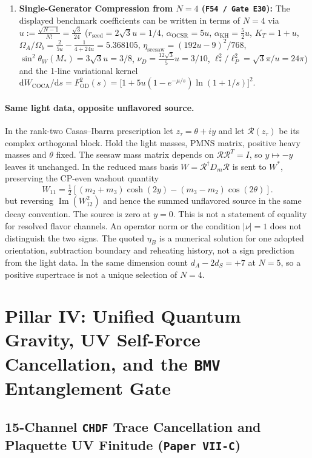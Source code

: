 \documentclass[11pt,a4paper]{article}
\begin{document}
\begin{enumerate}[label=(\arabic*),leftmargin=1.8em,itemsep=2pt]
\item \textbf{Single-Generator Compression from $N = 4$ (\texttt{F54 / Gate E30}):} The displayed benchmark coefficients can be written in terms of $N = 4$ via $u := \frac{\sqrt{N-1}}{N!} = \frac{\sqrt{3}}{24}$ ($r_{\mathrm{seed}} = 2\sqrt{3}u = 1/4$, $\alpha_{\mathrm{OCSR}} = 5u$, $\alpha_{\mathrm{KH}} = \frac{5}{2}u$, $K_T = 1+u$, $\Omega_A/\Omega_b = \frac{2}{5u} - \frac{1}{4+24u} = 5.368105$, $\eta_{\mathrm{seesaw}} = (192u-9)^2/768$, $\sin^2\theta_W(M_*) = 3\sqrt{3}u = 3/8$, $\nu_D = \frac{12\sqrt{3}}{5}u = 3/10$, $\ell_*^2/\ell_P^2 = \sqrt{3}\pi/u = 24\pi$) and the 1-line variational kernel $\mathrm{d}W_{\mathrm{COCA}}/\mathrm{d}s = F_{\mathrm{OD}}^2(s) = \bigl[1 + 5u(1 - e^{-\mu/s})\ln(1 + 1/s)\bigr]^2$.
\end{enumerate}

\paragraph{Same light data, opposite unflavored source.}
In the rank-two Casas--Ibarra prescription let $z_\tau=\theta+iy$ and let $\mathcal R(z_\tau)$ be its complex orthogonal block. Hold the light masses, PMNS matrix, positive heavy masses and $\theta$ fixed. The seesaw mass matrix depends on $\mathcal R\mathcal R^{T}=I$, so $y\mapsto-y$ leaves it unchanged. In the reduced mass basis $W=\mathcal R^\dagger D_m\mathcal R$ is sent to $W^*$, preserving the CP-even washout quantity
\[
 W_{11}=\tfrac12[(m_2+m_3)\cosh(2y)-(m_3-m_2)\cos(2\theta)] .
\]
but reversing $\operatorname{Im}(W_{12}^2)$ and hence the summed unflavored source in the same decay convention. The source is zero at $y=0$. This is not a statement of equality for resolved flavor channels. An operator norm or the condition $|\nu|=1$ does not distinguish the two signs. The quoted $\eta_B$ is a numerical solution for one adopted orientation, subtraction boundary and reheating history, not a sign prediction from the light data. In the same dimension count $d_A-2d_S=+7$ at $N=5$, so a positive supertrace is not a unique selection of $N=4$.

\section{Pillar IV: Unified Quantum Gravity, UV Self-Force Cancellation, and the \texttt{BMV} Entanglement Gate}

\subsection{15-Channel \texttt{CHDF} Trace Cancellation and Plaquette UV Finitude (\texttt{Paper VII-C})}
\end{document}
